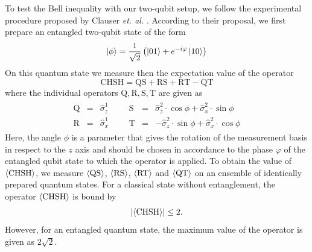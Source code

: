 To test the Bell inequality with our two-qubit setup, we follow the experimental procedure proposed by Clauser {\it et. al.} \citep{clauser_proposed_1969}. According to their proposal, we first prepare an entangled two-qubit state of the form
%
\begin{equation}
\left| \phi \right> = \frac{1}{\sqrt{2}}\left(\left| 01 \right>+e^{-i\varphi}\left| 10 \right>\right) \label{eq:chsh_state}
\end{equation}
%
On this quantum state we measure then the expectation value of the operator
%
\begin{equation}
\mathrm{CHSH} = \mathrm{QS}+\mathrm{RS}+\mathrm{RT}-\mathrm{QT}
\end{equation}
%
where the individual operators $\mathrm{Q,R,S,T}$ are given as
%
\begin{eqnarray}
	\begin{array}{cccccccc}
		\mathrm{Q} & = & \hat{\sigma}_z^1 &&& \mathrm{S} & = & \hat{\sigma}_z^2\cdot \cos{\phi}+\hat{\sigma}_x^2 \cdot \sin{\phi} \\
		\mathrm{R} & = & \hat{\sigma}_x^1 &&& \mathrm{T} & = & -\hat{\sigma}_z^2\cdot \sin{\phi}+\hat{\sigma}_x^2 \cdot \cos{\phi}
	\end{array}
\end{eqnarray} 
%
Here, the angle $\phi$ is a parameter that gives the rotation of the measurement basis in respect to the $z$ axis and should be chosen in accordance to the phase $\varphi$ of the entangled qubit state to which the operator is applied. To obtain the value of $\left< \mathrm{CHSH} \right>$, we measure $\left< \mathrm{QS} \right>$, $\left< \mathrm{RS} \right>$, $\left< \mathrm{RT} \right>$ and $\left< \mathrm{QT} \right>$ on an ensemble of identically prepared quantum states. For a classical state without entanglement, the operator $\left< \mathrm{CHSH} \right>$ is bound by
%
\begin{equation}
\left|\left< \mathrm{CHSH} \right>\right| \le 2. \label{eq:chsh_max}
\end{equation}
%
However, for an entangled quantum state, the maximum value of the operator is given as $2\sqrt{2}$. 

\smallskip

